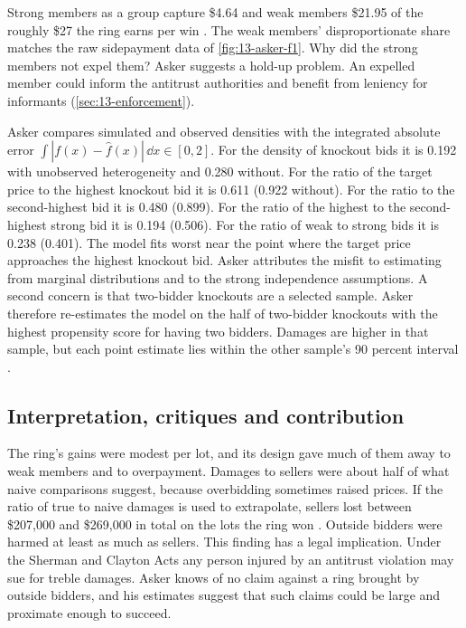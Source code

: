 Strong members as a group capture \$4.64 and weak members \$21.95 of the roughly \$27 the ring earns per win
\citep[p.~756]{Asker2010}. The weak members' disproportionate share matches the raw sidepayment data of
\cref{fig:13-asker-f1}. Why did the strong members not expel them? Asker suggests a hold-up problem. An expelled
member could inform the antitrust authorities and benefit from leniency for informants (\cref{sec:13-enforcement}).

Asker compares simulated and observed densities with the integrated absolute error
$\int|f(x)-\hat f(x)|\,\dd x\in[0,2]$. For the density of knockout bids it is 0.192 with unobserved heterogeneity
and 0.280 without. For the ratio of the target price to the highest knockout bid it is 0.611 (0.922 without). For
the ratio to the second-highest bid it is 0.480 (0.899). For the ratio of the highest to the second-highest strong
bid it is 0.194 (0.506). For the ratio of weak to strong bids it is 0.238 (0.401). The model fits worst near the
point where the target price approaches the highest knockout bid. Asker attributes the misfit to estimating from
marginal distributions and to the strong independence assumptions. A second concern is that two-bidder knockouts
are a selected sample. Asker therefore re-estimates the model on the half of two-bidder knockouts with the
highest propensity score for having two bidders. Damages are higher in that sample, but each point estimate lies
within the other sample's 90 percent interval \citep[pp.~756--758]{Asker2010}.

\subsection{Interpretation, critiques and contribution}\label{sec:13-asker-assessment}

The ring's gains were modest per lot, and its design gave much of them away to weak members and to overpayment.
Damages to sellers were about half of what naive comparisons suggest, because overbidding sometimes raised
prices. If the ratio of true to naive damages is used to extrapolate, sellers lost between \$207,000 and
\$269,000 in total on the lots the ring won \citep[footnote 54]{Asker2010}. Outside bidders were harmed at least as
much as sellers. This finding has a legal implication. Under the Sherman and Clayton Acts any person injured by an
antitrust violation may sue for treble damages. Asker knows of no claim against a ring brought by outside bidders,
and his estimates suggest that such claims could be large and proximate enough to succeed.

